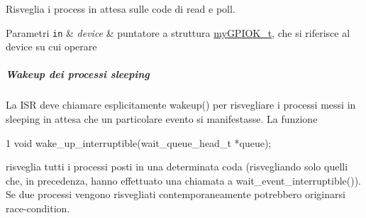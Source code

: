 Risveglia i process in attesa sulle code di read e poll. 


\begin{DoxyParams}[1]{Parametri}
\mbox{\tt in}  & {\em device} & puntatore a struttura \hyperlink{structmy_g_p_i_o_k__t}{my\+G\+P\+I\+O\+K\+\_\+t}, che si riferisce al device su cui operare\\
\hline
\end{DoxyParams}
\subparagraph*{Wakeup dei processi sleeping}

La I\+S\+R deve chiamare esplicitamente wakeup() per risvegliare i processi messi in sleeping in attesa che un particolare evento si manifestasse. La funzione 
\begin{DoxyCode}
1 void wake\_up\_interruptible(wait\_queue\_head\_t *queue);
\end{DoxyCode}
 risveglia tutti i processi posti in una determinata coda (risvegliando solo quelli che, in precedenza, hanno effettuato una chiamata a wait\+\_\+event\+\_\+interruptible()). Se due processi vengono risvegliati contemporaneamente potrebbero originarsi race-\/condition. 